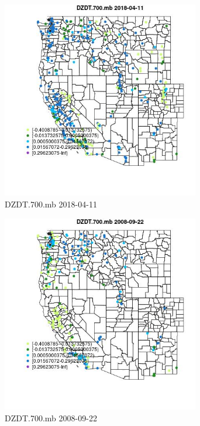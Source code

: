 \begin{figure} 
\centering  
\includegraphics[width=0.77\textwidth]{Code_Outputs/Report_ML_input_PM25_Step4_part_e_de_duplicated_aves_compiled_2019-05-18wNAs_MapObsDZDT700mb2018-04-11.jpg} 
\caption{\label{fig:Report_ML_input_PM25_Step4_part_e_de_duplicated_aves_compiled_2019-05-18wNAsMapObsDZDT700mb2018-04-11}DZDT.700.mb 2018-04-11} 
\end{figure} 
 

\begin{figure} 
\centering  
\includegraphics[width=0.77\textwidth]{Code_Outputs/Report_ML_input_PM25_Step4_part_e_de_duplicated_aves_compiled_2019-05-18wNAs_MapObsDZDT700mb2008-09-22.jpg} 
\caption{\label{fig:Report_ML_input_PM25_Step4_part_e_de_duplicated_aves_compiled_2019-05-18wNAsMapObsDZDT700mb2008-09-22}DZDT.700.mb 2008-09-22} 
\end{figure} 
 

